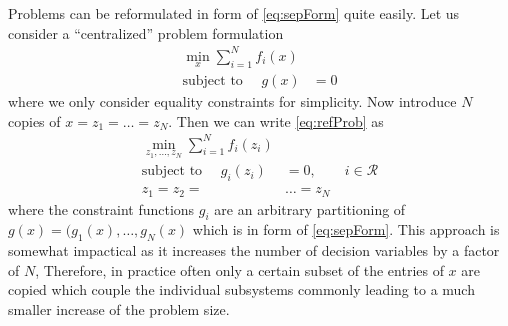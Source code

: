 \documentclass[]{scrartcl}
\begin{document}
Problems can be reformulated in form of \eqref{eq:sepForm} quite easily.
Let us consider a ``centralized'' problem formulation
\begin{subequations} \label{eq:refProb}
	\begin{align} 
	\min_{x} \sum_{i=1}^N  f_i(x)& \\
	\text{subject to }\quad  g(x)&= 0 
	\end{align}
\end{subequations}
where we only consider equality constraints for simplicity.
Now introduce $N$ copies of $x=z_1=\dots=z_N$.
Then we can write \eqref{eq:refProb} as
\begin{align*} 
\min_{z_1,\dots,z_N} \sum_{i=1}^N  f_i(z_i)& \\
\text{subject to }\quad  g_i(z_i)&= 0, \qquad i \in \mathcal{R} \\
z_1=z_2=&\dots=z_N
\end{align*}
where the constraint functions $g_i$ are an arbitrary partitioning of $g(x)=(g_1(x),\dots,g_N(x)$ which is in form of \eqref{eq:sepForm}.
This approach is somewhat impactical as it increases the number of decision variables by a factor of $N$, 
Therefore, in practice often only a certain subset of the entries of $x$ are copied which couple the individual subsystems commonly leading to a much smaller increase of the problem size.
\end{document}
